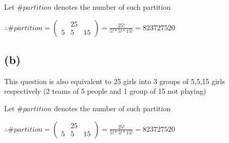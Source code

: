 \documentclass[12pt]{article}
\begin{document}
\begin{spacing}{2.0}
Let $\#partition$ denotes the number of such partition

$\therefore \#partition= \left(
\begin{array}{ccc}
  & 25 & \\
5 & 5 & 15 
\end{array}
\right)= \frac{25!}{5!*5!*15!}=823727520$

\subsection*{(b)}
This question is also equivalent to 25 girls into 3 groups of 5,5,15 girls respectively (2 teams of 5 people and 1 group of 15 not playing)

Let $\#partition$ denotes the number of such partition

$\therefore \#partition= \left(
\begin{array}{ccc}
  & 25 & \\
5 & 5 & 15
\end{array}
\right)= \frac{25!}{5!*5!*15!}=823727520$

\end{spacing}
\end{document}

